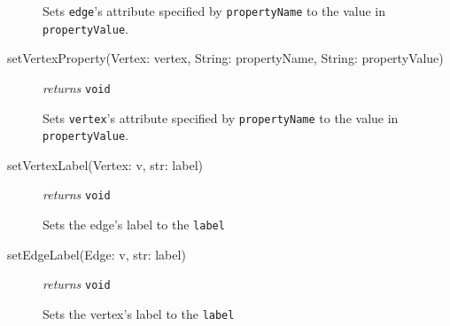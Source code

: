 \documentclass{article}
\begin{document}
\begin{description}
Sets \texttt{edge}'s attribute specified by \texttt{propertyName} to the value in \texttt{propertyValue}.

\item[setVertexProperty(Vertex: vertex, String: propertyName, String: propertyValue)] \emph{returns} \texttt{void}

Sets \texttt{vertex}'s attribute specified by \texttt{propertyName} to the value in \texttt{propertyValue}.

\item[setVertexLabel(Vertex: v, str: label)] \emph{returns} \texttt{void}

Sets the edge's label to the \texttt{label}

\item[setEdgeLabel(Edge: v, str: label)] \emph{returns} \texttt{void}

Sets the vertex's label to the \texttt{label}
  
\end{description}
\end{document}
